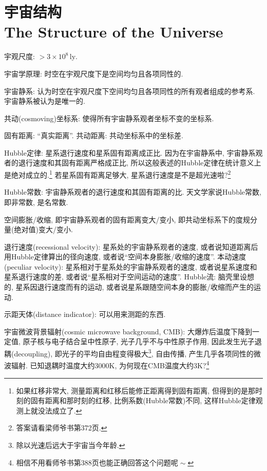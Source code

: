 \chapter{宇宙结构\\The Structure of the Universe}

宇观尺度: $>3\times10^{8}\,\text{ly}$.

宇宙学原理: 时空在宇观尺度下是空间均匀且各项同性的.

宇宙静系: 认为时空在宇观尺度下空间均匀且各项同性的所有观者组成的参考系. 宇宙静系被认为是唯一的.

共动(cosmoving)坐标系: 使得所有宇宙静系观者坐标不变的坐标系.

固有距离: ``真实距离''. 共动距离: 共动坐标系中的坐标差.

Hubble定律: 星系退行速度和星系固有距离成正比. 因为在宇宙静系中, 宇宙静系观者的退行速度和其固有距离严格成正比, 所以这般表述的Hubble定律在统计意义上是绝对成立的.\footnote{如果红移非常大, 测量距离和红移后能修正距离得到固有距离, 但得到的是那时刻的固有距离和那时刻的红移, 比例系数(Hubble常数)不同, 这样Hubble定律观测上就没法成立了.} 若星系固有距离足够大, 星系退行速度是不是超光速啦?\footnote{答案请看梁师爷书第372页.}

Hubble常数: 宇宙静系观者的退行速度和其固有距离的比. 天文学家说Hubble常数, 即非常数, 是名常数.

空间膨胀/收缩, 即宇宙静系观者的固有距离变大/变小, 即共动坐标系下的度规分量(绝对值)变大/变小.

退行速度(recessional velocity): 星系处的宇宙静系观者的速度, 或者说知道距离后用Hubble定律算出的径向速度, 或者说``空间本身膨胀/收缩的速度''. 本动速度(peculiar velocity): 星系相对于星系处的宇宙静系观者的速度, 或者说星系速度和星系退行速度的差, 或者说``星系相对于空间运动的速度''. Hubble流: 脑壳里设想的, 星系因退行速度而有的运动, 或者说星系跟随空间本身的膨胀/收缩而产生的运动.

示距天体(distance indicator): 可以用来测距的东西.

宇宙微波背景辐射(cosmic microwave background, CMB): 大爆炸后温度下降到一定值, 原子核与电子结合呈中性原子, 光子几乎不与中性原子作用, 因此发生光子退耦(decoupling), 即光子的平均自由程变得极大\footnote{除以光速后远大于宇宙当今年龄.}, 自由传播, 产生几乎各项同性的微波辐射. 已知退耦时温度大约$3000\text{K}$, 为何现在CMB温度大约$3\text{K}$?\footnote{相信不用看师爷书第388页也能正确回答这个问题呢$\!\sim$}
